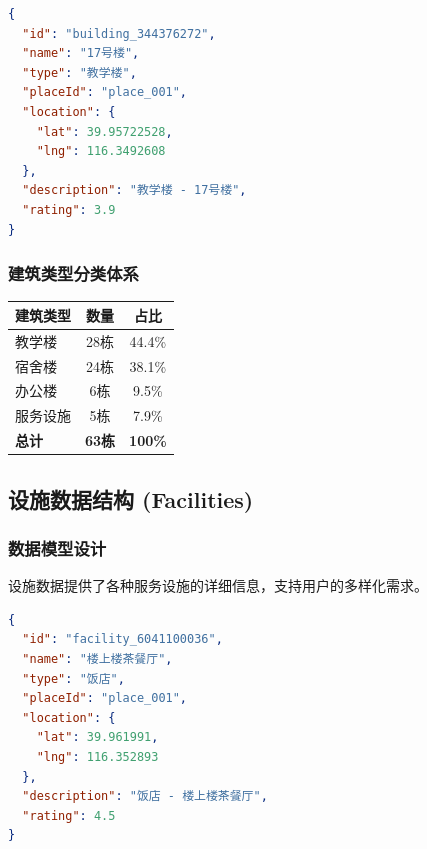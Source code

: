 \documentclass[12pt,a4paper]{article}
\begin{document}
\begin{lstlisting}[language=json, caption={建筑物数据结构示例}]
{
  "id": "building_344376272",
  "name": "17号楼",
  "type": "教学楼",
  "placeId": "place_001",
  "location": {
    "lat": 39.95722528,
    "lng": 116.3492608
  },
  "description": "教学楼 - 17号楼",
  "rating": 3.9
}
\end{lstlisting}

\subsubsection{建筑类型分类体系}
\begin{table}[H]
\centering
\begin{tcolorbox}[
    colback=light,
    colframe=primary,
    title={\textbf{建筑物分类统计}},
    coltitle=white,
    colbacktitle=primary,
    fonttitle=\bfseries,
    rounded corners=5pt,
    width=0.8\textwidth
]
\begin{tabular}{lcc}
\toprule
\rowcolor{primary!20}
\textbf{建筑类型} & \textbf{数量} & \textbf{占比} \\
\midrule
教学楼 & 28栋 & 44.4\% \\
\rowcolor{light}
宿舍楼 & 24栋 & 38.1\% \\
办公楼 & 6栋 & 9.5\% \\
\rowcolor{light}
服务设施 & 5栋 & 7.9\% \\
\midrule
\rowcolor{accent!20}
\textbf{总计} & \textcolor{dark}{\textbf{63栋}} & \textcolor{dark}{\textbf{100\%}} \\
\bottomrule
\end{tabular}
\end{tcolorbox}
\end{table}

\subsection{设施数据结构 (Facilities)}

\subsubsection{数据模型设计}
设施数据提供了各种服务设施的详细信息，支持用户的多样化需求。

\begin{lstlisting}[language=json, caption={设施数据结构示例}]
{
  "id": "facility_6041100036",
  "name": "楼上楼茶餐厅",
  "type": "饭店",
  "placeId": "place_001",
  "location": {
    "lat": 39.961991,
    "lng": 116.352893
  },
  "description": "饭店 - 楼上楼茶餐厅",
  "rating": 4.5
}
\end{lstlisting}
\end{document}
